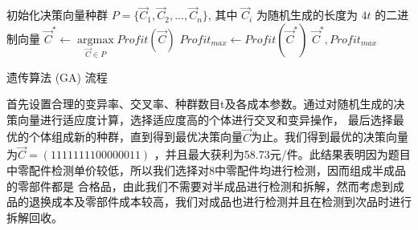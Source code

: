 \documentclass[withoutpreface,bwprint]{cumcmthesis} %
\begin{document}
\begin{adjustbox}{width=16cm,height=6.5cm}
    \centering
    \begin{algorithm}[H]
        \SetAlgoLined
        初始化决策向量种群 $P = \{\vec{C}_1, \vec{C}_2, ..., \vec{C}_n\}$, 其中 $\vec{C}_i$ 为随机生成的长度为 $4t$ 的二进制向量 \;
		$\vec{C}^* \leftarrow \underset{\vec{C} \in P}{\operatorname{argmax}}  Profit(\vec{C})$ \;
        $Profit_{max} \leftarrow Profit(\vec{C}^*)$ \;
        \Return $\vec{C}^*, Profit_{max}$
        \caption{遗传算法 (GA) 流程}
    \end{algorithm}
\end{adjustbox}
首先设置合理的变异率、交叉率、种群数目t及各成本参数。通过对随机生成的决策向量进行适应度计算，选择适应度高的个体进行交叉和变异操作，
最后选择最优的个体组成新的种群，直到得到最优决策向量$\vec{C}$为止。我们得到最优的决策向量为$\vec{C}=(1111111100000011)$
，并且最大获利为58.73元/件。此结果表明因为题目中零配件检测单价较低，所以我们选择对8中零配件均进行检测，因而组成半成品的零部件都是
合格品，由此我们不需要对半成品进行检测和拆解，然而考虑到成品的退换成本及零部件成本较高，我们对成品也进行检测并且在检测到次品时进行拆解回收。
\end{document}
